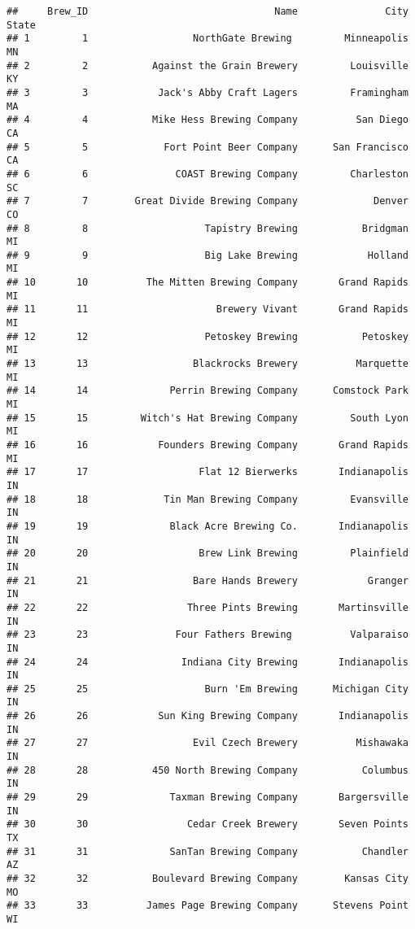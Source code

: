 \documentclass[
]{article}
\begin{document}
\begin{verbatim}
##     Brew_ID                                Name               City State
## 1         1                  NorthGate Brewing         Minneapolis    MN
## 2         2           Against the Grain Brewery         Louisville    KY
## 3         3            Jack's Abby Craft Lagers         Framingham    MA
## 4         4           Mike Hess Brewing Company          San Diego    CA
## 5         5             Fort Point Beer Company      San Francisco    CA
## 6         6               COAST Brewing Company         Charleston    SC
## 7         7        Great Divide Brewing Company             Denver    CO
## 8         8                    Tapistry Brewing           Bridgman    MI
## 9         9                    Big Lake Brewing            Holland    MI
## 10       10          The Mitten Brewing Company       Grand Rapids    MI
## 11       11                      Brewery Vivant       Grand Rapids    MI
## 12       12                    Petoskey Brewing           Petoskey    MI
## 13       13                  Blackrocks Brewery          Marquette    MI
## 14       14              Perrin Brewing Company      Comstock Park    MI
## 15       15         Witch's Hat Brewing Company         South Lyon    MI
## 16       16            Founders Brewing Company       Grand Rapids    MI
## 17       17                   Flat 12 Bierwerks       Indianapolis    IN
## 18       18             Tin Man Brewing Company         Evansville    IN
## 19       19              Black Acre Brewing Co.       Indianapolis    IN
## 20       20                   Brew Link Brewing         Plainfield    IN
## 21       21                  Bare Hands Brewery            Granger    IN
## 22       22                 Three Pints Brewing       Martinsville    IN
## 23       23               Four Fathers Brewing          Valparaiso    IN
## 24       24                Indiana City Brewing       Indianapolis    IN
## 25       25                    Burn 'Em Brewing      Michigan City    IN
## 26       26            Sun King Brewing Company       Indianapolis    IN
## 27       27                  Evil Czech Brewery          Mishawaka    IN
## 28       28           450 North Brewing Company           Columbus    IN
## 29       29              Taxman Brewing Company       Bargersville    IN
## 30       30                 Cedar Creek Brewery       Seven Points    TX
## 31       31              SanTan Brewing Company           Chandler    AZ
## 32       32           Boulevard Brewing Company        Kansas City    MO
## 33       33          James Page Brewing Company      Stevens Point    WI

\end{verbatim}
\end{document}
